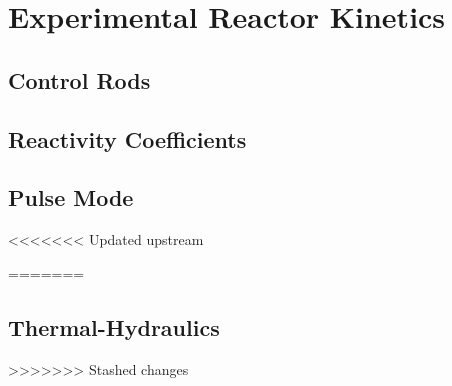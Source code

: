 \documentclass[11pt,a4paper,twoside]{book}
\begin{document}

\pagestyle{fancy} %

\part{Experimental Reactor Kinetics}
\chapter{Control Rods}
\graphicspath{{chapters/experimental_reactor_kinetics/images/}}



\chapter{Reactivity Coefficients}

\chapter{Pulse Mode}
<<<<<<< Updated upstream

=======

\chapter{Thermal-Hydraulics}
>>>>>>> Stashed changes

%
\end{document}
